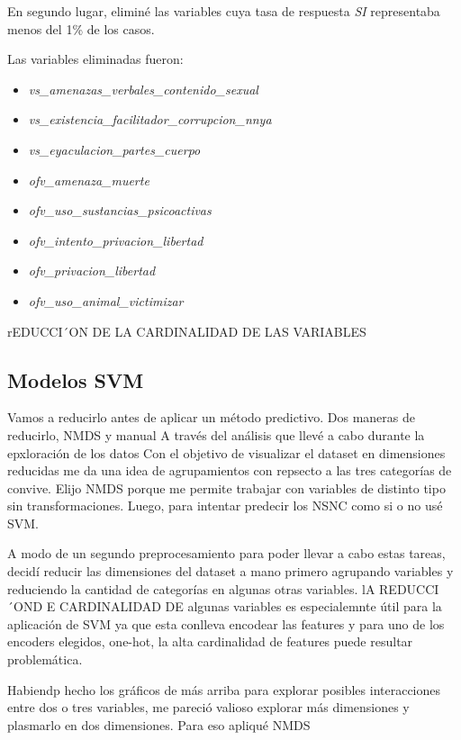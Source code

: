 \documentclass[10 pt]{article}
\begin{document}
En segundo lugar, eliminé las variables cuya tasa de respuesta \textit{SI} representaba menos del 1\% de los casos. 

Las variables eliminadas fueron:

\begin{itemize}
    \item \textit{vs\_amenazas\_verbales\_contenido\_sexual} 
    \item \textit{vs\_existencia\_facilitador\_corrupcion\_nnya}
    \item \textit{vs\_eyaculacion\_partes\_cuerpo}
    \item \textit{ofv\_amenaza\_muerte}
    \item \textit{ofv\_uso\_sustancias\_psicoactivas} 
    \item \textit{ofv\_intento\_privacion\_libertad}
    \item \textit{ofv\_privacion\_libertad}
    \item \textit{ofv\_uso\_animal\_victimizar} 
\end{itemize}


rEDUCCI´ON DE LA CARDINALIDAD DE LAS VARIABLES 

\subsection{Modelos SVM}

Vamos a reducirlo antes de aplicar un método predictivo. Dos maneras de reducirlo, NMDS y manual
A través del análisis que llevé a cabo durante la epxloración de los datos Con el objetivo de visualizar el dataset en dimensiones reducidas me da una
idea de agrupamientos con repsecto a las tres categorías de convive. Elijo NMDS porque me permite trabajar con
variables de distinto tipo sin transformaciones.
 Luego, para intentar predecir los NSNC como si o no usé SVM. 

A modo de un segundo preprocesamiento para poder llevar a cabo estas tareas, decidí reducir las dimensiones del dataset a mano primero agrupando variables y reduciendo la cantidad de categorías en algunas otras variables. lA REDUCCI´OND E CARDINALIDAD DE algunas variables es especialemnte útil para la aplicación de SVM ya que esta conlleva encodear las features y para uno de los encoders elegidos, one-hot, la alta cardinalidad de features puede resultar problemática.


Habiendp hecho los gráficos de más arriba para explorar posibles interacciones entre dos o tres variables, me pareció valioso explorar más dimensiones y plasmarlo en dos dimensiones. Para eso apliqué NMDS
\end{document}
